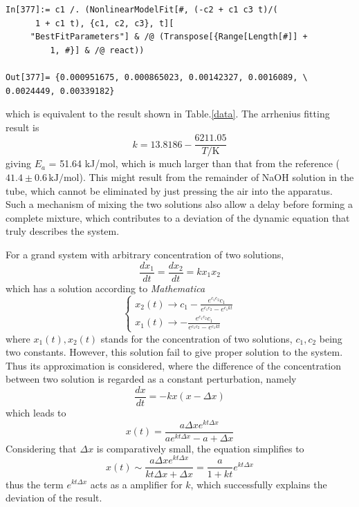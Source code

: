 \documentclass[%
 reprint,
 amsmath,amssymb,
 aps,
10.5pt,
]{revtex4-1}
\begin{document}
\begin{lstlisting}
In[377]:= c1 /. (NonlinearModelFit[#, (-c2 + c1 c3 t)/(
      1 + c1 t), {c1, c2, c3}, t][
     "BestFitParameters"] & /@ (Transpose[{Range[Length[#]] + 
         1, #}] & /@ react))

Out[377]= {0.000951675, 0.000865023, 0.00142327, 0.0016089, \
0.0024449, 0.00339182}
\end{lstlisting}
which is equivalent to the result shown in Table.\ref{data}. The arrhenius fitting result is
\begin{equation}
	k = 13.8186 - \frac{6211.05}{T/\mathrm{K}} 
\end{equation}
giving $E_a$ = 51.64 kJ/mol, which is much larger than that from the reference ($41.4\pm 0.6 \, \mathrm{kJ/mol}$)\cite{soap}. This might result from the remainder of NaOH solution in the tube, which cannot be eliminated by just pressing the air into the apparatus. Such a mechanism of mixing the two solutions also allow a delay before forming a complete mixture, which contributes to a deviation of the dynamic equation that truly describes the system. 

For a grand system with arbitrary concentration of two solutions,
\begin{equation}
	\frac{d x_1}{dt} = \frac{d x_2}{dt} = k x_1 x_2
\end{equation}
which has a solution according to \emph{Mathematica}
\begin{equation}
\begin{cases}
	x_2(t)\to c_1-\frac{e^{c_1 c_2} c_1}{e^{c_1 c_2}-e^{c_1 k t}} \\
	x_1(t)\to -\frac{e^{c_1 c_2} c_1}{e^{c_1 c_2}-e^{c_1 k t}}
   \end{cases}
\end{equation}
where $x_1(t),x_2(t)$ stands for the concentration of two solutions, $c_1,c_2$ being two constants. However, this solution fail to give proper solution to the system. Thus its approximation is considered, where the difference of the concentration between two solution is regarded as a constant perturbation, namely
\begin{equation}
\frac{d x}{dt} = - k x (x-\Delta x)
\end{equation}
which leads to
\begin{equation}
	x(t) = \frac{a \Delta x e^{k t \Delta x }}{a e^{k t \Delta x }-a+\Delta x}
\end{equation}
Considering that $\Delta x$ is comparatively small, the equation simplifies to
\begin{equation}
	x(t) \sim \frac{a \Delta x e^{k t \Delta x }}{k t \Delta x+\Delta x} = \frac{a}{1+ kt} e^{kt\Delta x}
\end{equation}
thus the term $e^{kt\Delta x}$ acts as a amplifier for $k$, which successfully explains the deviation of the result. 
\end{document}
